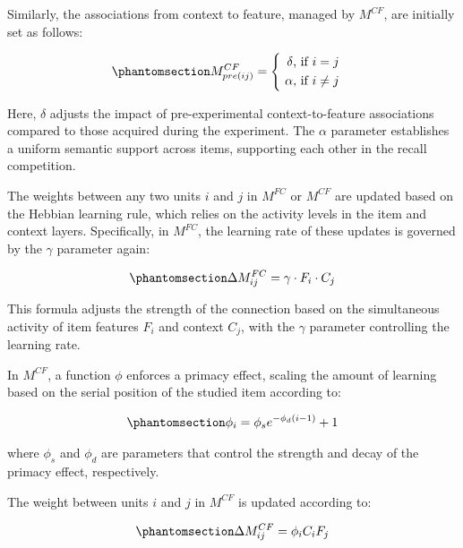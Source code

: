 \documentclass[
  letterpaper,
  11pt,
  english,
  singlespacing,
  headsepline]{MastersDoctoralThesis}
\begin{document}
Similarly, the associations from context to feature, managed by
\(M^{CF}\), are initially set as follows:

\begin{equation}\phantomsection\label{eq-2}{
M^{CF}_{pre(ij)} = \begin{cases} \begin{alignedat}{2} \delta \text{, if } i=j \\\
          \alpha \text{, if } i \neq j
       \end{alignedat} \end{cases}
}\end{equation}

Here, \(\delta\) adjusts the impact of pre-experimental
context-to-feature associations compared to those acquired during the
experiment. The \(\alpha\) parameter establishes a uniform semantic
support across items, supporting each other in the recall competition.

The weights between any two units \(i\) and \(j\) in \(M^{FC}\) or
\(M^{CF}\) are updated based on the Hebbian learning rule, which relies
on the activity levels in the item and context layers. Specifically, in
\(M^{FC}\), the learning rate of these updates is governed by the
\(\gamma\) parameter again:

\begin{equation}\phantomsection\label{eq-3}{
\Delta M^{FC}_{ij} = \gamma \cdot F_i \cdot C_j
}\end{equation}

This formula adjusts the strength of the connection based on the
simultaneous activity of item features \(F_i\) and context \(C_j\), with
the \(\gamma\) parameter controlling the learning rate.

In \(M^{CF}\), a function \(\phi\) enforces a primacy effect, scaling
the amount of learning based on the serial position of the studied item
according to:

\begin{equation}\phantomsection\label{eq-4}{ 
\phi_i = \phi_se^{-\phi_d(i-1)} + 1
}\end{equation}

where \(\phi_s\) and \(\phi_d\) are parameters that control the strength
and decay of the primacy effect, respectively.

The weight between units \(i\) and \(j\) in \(M^{CF}\) is updated
according to:

\begin{equation}\phantomsection\label{eq-5}{
\Delta M^{CF}_{ij} = \phi_i C_i F_j
}\end{equation}
\end{document}
